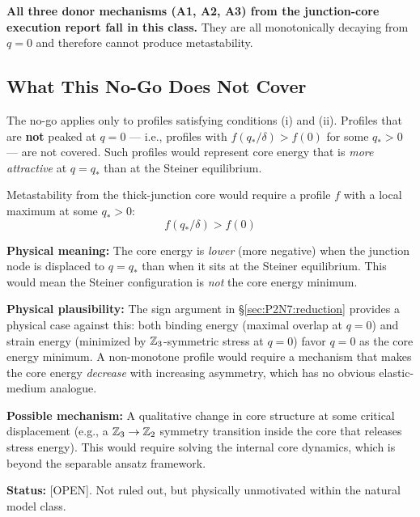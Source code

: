 \textbf{All three donor mechanisms (A1, A2, A3) from the junction-core
execution report fall in this class.} They are all monotonically
decaying from $q = 0$ and therefore cannot produce metastability.

\subsection{What This No-Go Does Not Cover}

The no-go applies only to profiles satisfying conditions (i) and (ii).
Profiles that are \textbf{not} peaked at $q = 0$ --- i.e., profiles with
$f(q_*/\delta) > f(0)$ for some $q_* > 0$ --- are not covered. Such
profiles would represent core energy that is \emph{more attractive} at
$q = q_*$ than at the Steiner equilibrium.

\begin{edcopenbox}[title=Escape Route: Non-Monotone Core Energy]
Metastability from the thick-junction core would require a profile $f$
with a local maximum at some $q_* > 0$:
\begin{equation}
    f(q_*/\delta) > f(0)
    \label{eq:N7_escape}
\end{equation}

\textbf{Physical meaning:} The core energy is \emph{lower} (more
negative) when the junction node is displaced to $q = q_*$ than when
it sits at the Steiner equilibrium. This would mean the Steiner
configuration is \emph{not} the core energy minimum.

\textbf{Physical plausibility:} The sign argument in
\S\ref{sec:P2N7:reduction} provides a physical case against this:
both binding energy (maximal overlap at $q=0$) and strain energy
(minimized by $\mathbb{Z}_3$-symmetric stress at $q=0$) favor $q = 0$ as
the core energy minimum. A non-monotone profile would require a
mechanism that makes the core energy \emph{decrease} with increasing
asymmetry, which has no obvious elastic-medium analogue.

\textbf{Possible mechanism:} A qualitative change in core structure
at some critical displacement (e.g., a $\mathbb{Z}_3 \to \mathbb{Z}_2$ symmetry
transition inside the core that releases stress energy). This would
require solving the internal core dynamics, which is beyond the
separable ansatz framework.

\textbf{Status:} [OPEN]. Not ruled out, but physically unmotivated
within the natural model class.
\tagOpen
\end{edcopenbox}

